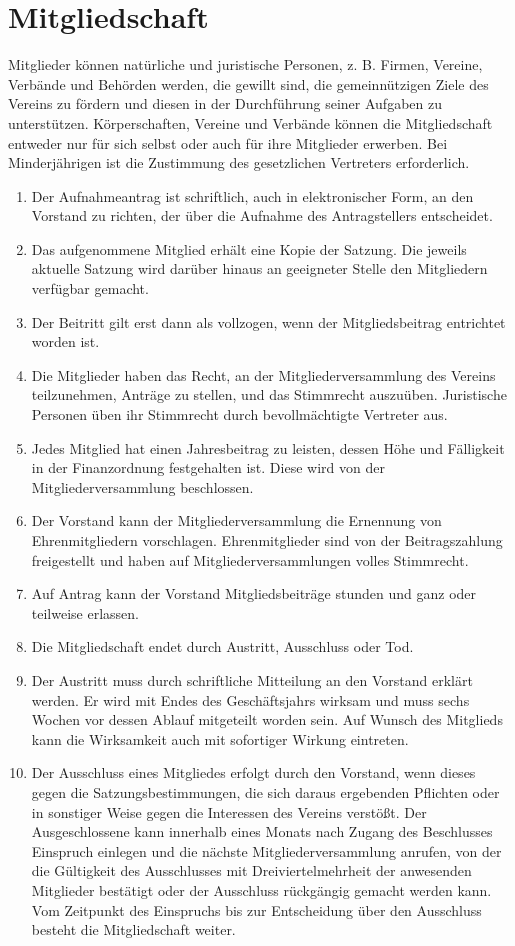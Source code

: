 \documentclass[12pt,a4paper,titlepage]{scrartcl}
\begin{document}
\section{Mitgliedschaft}
Mitglieder können natürliche und juristische Personen, z. B. Firmen, Vereine, 
Verbände und Behörden werden, die gewillt sind, die gemeinnützigen Ziele des Vereins 
zu fördern und diesen in der Durchführung seiner Aufgaben zu unterstützen. 
Körperschaften, Vereine und Verbände können die Mitgliedschaft entweder nur für sich 
selbst oder auch für ihre Mitglieder erwerben. Bei Minderjährigen ist die Zustimmung des 
gesetzlichen Vertreters erforderlich.
\begin{enumerate}
\item Der Aufnahmeantrag ist schriftlich, auch in elektronischer Form, an den 
Vorstand zu richten, der über die Aufnahme des Antragstellers entscheidet. 
\item Das aufgenommene Mitglied erhält eine Kopie der Satzung. Die jeweils 
aktuelle Satzung wird darüber hinaus an geeigneter Stelle den Mitgliedern 
verfügbar gemacht. 
\item Der Beitritt gilt erst dann als vollzogen, wenn der Mitgliedsbeitrag entrichtet 
worden ist. 
\item Die Mitglieder haben das Recht, an der Mitgliederversammlung des Vereins 
teilzunehmen, Anträge zu stellen, und das Stimmrecht auszuüben. Juristische 
Personen üben ihr Stimmrecht durch bevollmächtigte Vertreter aus. 
\item Jedes Mitglied hat einen Jahresbeitrag zu leisten, dessen Höhe und Fälligkeit 
in der Finanzordnung festgehalten ist. Diese wird von der 
Mitgliederversammlung beschlossen. 
\item Der Vorstand kann der Mitgliederversammlung die Ernennung von 
Ehrenmitgliedern vorschlagen. Ehrenmitglieder sind von der Beitragszahlung
freigestellt und haben auf Mitgliederversammlungen volles Stimmrecht. 
\item Auf Antrag kann der Vorstand Mitgliedsbeiträge stunden und ganz oder 
teilweise erlassen. 
\item Die Mitgliedschaft endet durch Austritt, Ausschluss oder Tod. 
\item Der Austritt muss durch schriftliche Mitteilung an den Vorstand erklärt werden. 
Er wird mit Endes des Geschäftsjahrs wirksam und muss sechs Wochen vor 
dessen Ablauf mitgeteilt worden sein. Auf Wunsch des Mitglieds kann die 
Wirksamkeit auch mit sofortiger Wirkung eintreten. 
\item Der Ausschluss eines Mitgliedes erfolgt durch den Vorstand, wenn dieses gegen die Satzungsbestimmungen, die sich daraus ergebenden Pflichten oder in sonstiger Weise gegen die Interessen des Vereins verstößt. Der Ausgeschlossene kann 
innerhalb eines Monats nach Zugang des Beschlusses Einspruch einlegen und 
die nächste Mitgliederversammlung anrufen, von der die Gültigkeit des 
Ausschlusses mit Dreiviertelmehrheit der anwesenden Mitglieder bestätigt oder 
der Ausschluss rückgängig gemacht werden kann. Vom Zeitpunkt des 
Einspruchs bis zur Entscheidung über den Ausschluss besteht die Mitgliedschaft 
weiter. 
\end{enumerate}
\end{document}
